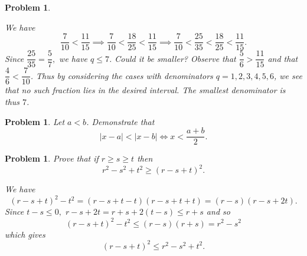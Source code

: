 \documentclass[11pt, openany]{book}
\theoremstyle{change} \theoremheaderfont{\blue\sffamily\bfseries}
\newtheorem{pro}[thm]{Problem}
\theoremstyle{nonumberplain} \theoremheaderfont{\sffamily\bfseries}
\def\absval#1{\left| #1 \right|}
\newcommand{\í}{\'{\i}}
\begin{document}
\begin{multicols}{2}
\begin{pro}
\begin{answer}
\bigskip
We have $$ \dfrac{7}{10} < \dfrac{11}{15} \implies \dfrac{7}{10} <
\dfrac{18}{25} < \dfrac{11}{15} \implies \dfrac{7}{10}
<\dfrac{25}{35} < \dfrac{18}{25} < \dfrac{11}{15}.    $$ Since
$\dfrac{25}{35} = \dfrac{5}{7},$ we have $q \leq 7$. Could it be
smaller? Observe that $\dfrac{5}{6} > \dfrac{11}{15} $ and that
$\dfrac{4}{6} < \dfrac{7}{10}$. Thus by considering the cases with
denominators $q = 1, 2, 3, 4, 5, 6$, we see that no such fraction
lies in the desired interval. The smallest denominator is thus $7$.
\end{answer}
\end{pro}

\begin{pro}
Let $a<b$. Demonstrate that $$\absval{x-a}<\absval{x-b} \iff
x<\dfrac{a+b}{2}.
$$
\end{pro}
\begin{pro}
Prove that if $r \geq s \geq t$ then
$$
r^2 - s^2 + t^2  \geq (r - s + t)^2. $$
\begin{answer}  We have
$$ (r - s + t)^2 - t^2 = (r - s + t - t)(r - s + t + t) = (r - s)(r - s + 2t).$$
Since $t - s \leq 0,$ $r - s + 2t = r + s + 2(t - s) \leq r + s$ and
so
$$(r - s + t)^2 - t^2 \leq (r - s)(r + s) = r^2 - s^2$$which gives
$$(r - s + t)^2 \leq r^2 - s^2 + t^2.$$
\end{answer}
\end{pro}


\end{multicols}
\end{document}
